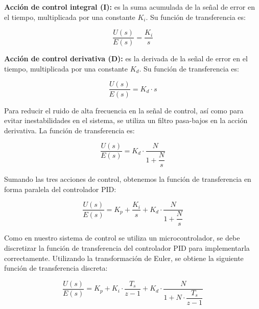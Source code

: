 \textbf{Acción de control integral (I):} es la suma acumulada de la señal de error en el tiempo, multiplicada
por una constante $K_i$. Su función de transferencia es:

\vspace{-0.5cm}
\begin{equation}
    \dfrac{U(s)}{E(s)} = \dfrac{K_i}{s}
\end{equation}
\vspace{-0.5cm}

\textbf{Acción de control derivativa (D):} es la derivada de la señal de error en el tiempo, multiplicada por
una constante $K_d$. Su función de transferencia es:

\vspace{-0.5cm}
\begin{equation}
    \dfrac{U(s)}{E(s)} = K_d \cdot s
\end{equation}
\vspace{-0.5cm}

Para reducir el ruido de alta frecuencia en la señal de control, así como para evitar inestabilidades
en el sistema, se utiliza un filtro pasa-bajos en la acción derivativa. La función de transferencia es:

\vspace{-0.5cm}
\begin{equation}
    \dfrac{U(s)}{E(s)} = K_d \cdot \dfrac{N}{1+\dfrac{N}{s}}
\end{equation}
\vspace{-0.5cm}

Sumando las tres acciones de control, obtenemos la función de transferencia en forma paralela del controlador PID:

\vspace{-0.5cm}
\begin{equation}
    \dfrac{U(s)}{E(s)} = K_p + \dfrac{K_i}{s} + K_d \cdot \dfrac{N}{1+\dfrac{N}{s}}
\end{equation}
\vspace{-0.5cm}

Como en nuestro sistema de control se utiliza un microcontrolador, se debe discretizar la función de transferencia
del controlador PID para implementarla correctamente. Utilizando la transformación de Euler, se obtiene la siguiente
función de transferencia discreta:

\vspace{-0.5cm}
\begin{equation}
    \dfrac{U(s)}{E(s)} = K_p + K_i \cdot \dfrac{T_s}{z-1} + K_d \cdot \dfrac{N}{1+N \cdot \dfrac{T_s}{z-1}}
\end{equation}
\vspace{-0.5cm}

